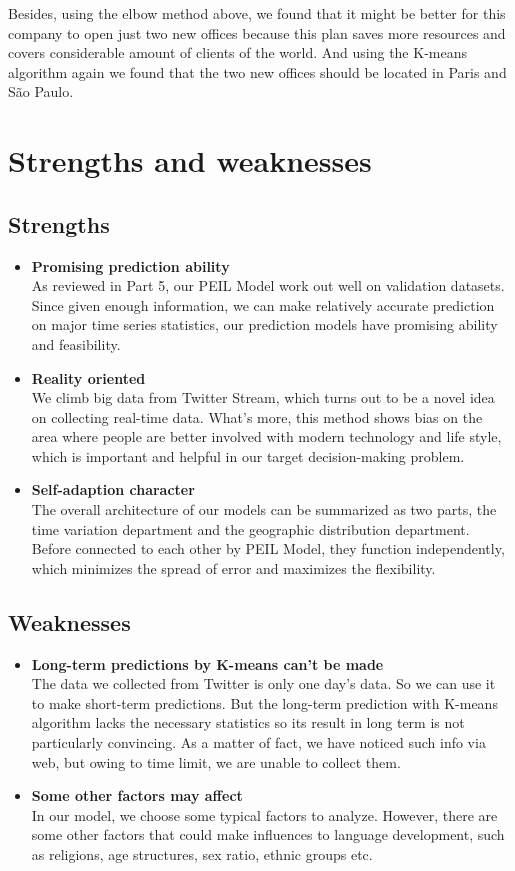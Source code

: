 \documentclass{mcmthesis}
\begin{document}
  \indent Besides, using the elbow method above, we found that it might be better for this company to open just two new offices because this plan saves more resources and covers considerable amount of clients of the world. And using the K-means algorithm again we found that the two new offices should be located in Paris and São Paulo. 
  
  
  \section{Strengths and weaknesses}
  
  \subsection{Strengths}
  \begin{itemize}
  \item \textbf{Promising prediction ability }\\
    As reviewed in Part 5, our PEIL Model work out well on validation datasets. Since given enough information, we can make relatively accurate prediction on major time series statistics, our prediction models have promising ability and feasibility.
   \item \textbf{Reality oriented}\\
    We climb big data from Twitter Stream, which turns out to be a novel idea on collecting real-time data. What's more, this method shows bias on the area where people are better involved with modern technology and life style, which is important and helpful in our target decision-making problem.
    \item \textbf{Self-adaption character}\\
    The overall architecture of our models can be summarized as two parts, the time variation department and the geographic distribution department. Before connected to each other by PEIL Model, they function independently, which minimizes the spread of error and maximizes the flexibility.
  \end{itemize}
  \subsection{Weaknesses}
  \begin{itemize}
     \item \textbf{Long-term predictions by K-means can't be made }\\
    The data we collected from Twitter is only one day's data. So we can use it to make short-term predictions. But the long-term prediction with K-means algorithm lacks the necessary statistics so its result in long term is not particularly convincing. As a matter of fact, we have noticed such info via web, but owing to time limit, we are unable to collect them.
  
    \item {\textbf{Some other factors may affect} }\\ 																In our model, we choose some typical factors to analyze. However, there are some other factors that could make influences to language development, such as religions, age structures, sex ratio, ethnic groups etc.
  \end{itemize}
  
\end{document}
